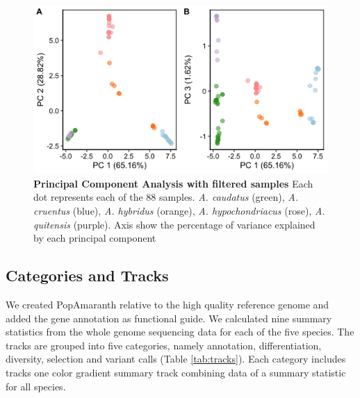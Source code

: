 \documentclass[9pt,twocolumn,twoside]{celabRxiv}
\begin{document}
\begin{figure}[ht]
\includegraphics[width=1\linewidth]{figures/pca_plots_side.png}
\caption{\textbf{Principal Component Analysis with filtered samples} Each dot represents each of the 88 samples. \textit{A. caudatus} (green), \textit{A. cruentus} (blue), \textit{A. hybridus} (orange), \textit{A. hypochondriacus} (rose), \textit{A. quitensis} (purple). Axis show the percentage of variance explained by each principal component }
\label{fig:pca}
\end{figure}


\subsection{Categories and Tracks}

We created PopAmaranth relative to the high quality reference genome \citep{lightfoot2017single} and added the gene annotation as functional guide.
We calculated nine summary statistics from the whole genome sequencing data for each of the five species.
The tracks are grouped into five categories, namely annotation, differentiation, diversity, selection and variant calls (Table \ref{tab:tracks}). 
Each category includes tracks one color gradient summary track combining data of a summary statistic for all species.


 
\end{document}
